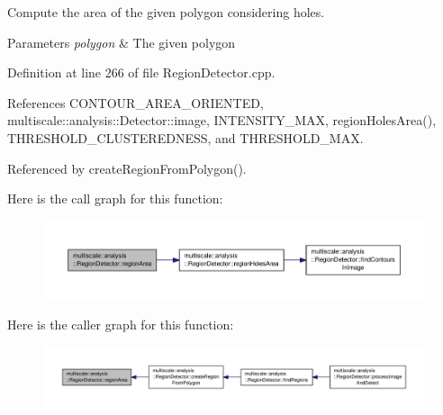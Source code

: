 Compute the area of the given polygon considering holes. 


\begin{DoxyParams}{Parameters}
{\em polygon} & The given polygon \\
\hline
\end{DoxyParams}


Definition at line 266 of file Region\-Detector.\-cpp.



References C\-O\-N\-T\-O\-U\-R\-\_\-\-A\-R\-E\-A\-\_\-\-O\-R\-I\-E\-N\-T\-E\-D, multiscale\-::analysis\-::\-Detector\-::image, I\-N\-T\-E\-N\-S\-I\-T\-Y\-\_\-\-M\-A\-X, region\-Holes\-Area(), T\-H\-R\-E\-S\-H\-O\-L\-D\-\_\-\-C\-L\-U\-S\-T\-E\-R\-E\-D\-N\-E\-S\-S, and T\-H\-R\-E\-S\-H\-O\-L\-D\-\_\-\-M\-A\-X.



Referenced by create\-Region\-From\-Polygon().



Here is the call graph for this function\-:
\nopagebreak
\begin{figure}[H]
\begin{center}
\leavevmode
\includegraphics[width=350pt]{classmultiscale_1_1analysis_1_1RegionDetector_a938fa8d165c87dc69e962883942072d2_cgraph}
\end{center}
\end{figure}




Here is the caller graph for this function\-:
\nopagebreak
\begin{figure}[H]
\begin{center}
\leavevmode
\includegraphics[width=350pt]{classmultiscale_1_1analysis_1_1RegionDetector_a938fa8d165c87dc69e962883942072d2_icgraph}
\end{center}
\end{figure}


